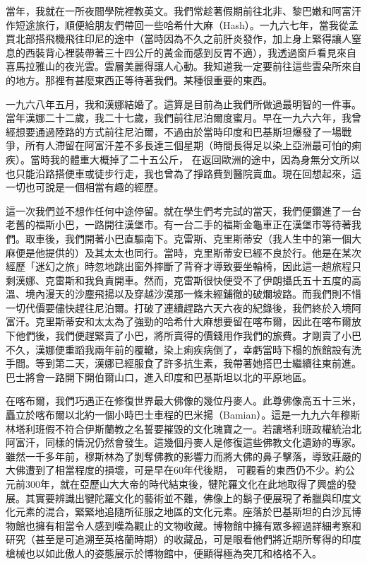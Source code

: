 當年，我就在一所夜間學院裡教英文。我們常趁著假期前往北非、黎巴嫩和阿富汗作短途旅行，順便給朋友們帶回一些哈希什大麻（Hash）。一九六七年，當我從孟買北部搭飛機飛往印尼的途中（當時因為不久之前肝炎發作，加上身上緊得讓人窒息的西裝背心裡裝帶著三十四公斤的黃金而感到反胃不適），我透過窗戶看見來自喜馬拉雅山的夜光雲。雲層美麗得讓人心動。我知道我一定要前往這些雲朵所來自的地方。那裡有甚麼東西正等待著我們。某種很重要的東西。

一九六八年五月，我和漢娜結婚了。這算是目前為止我們所做過最明智的一件事。當年漢娜二十二歲，我二十七歲，我們前往尼泊爾度蜜月。早在一九六六年，我曾經想要通過陸路的方式前往尼泊爾，不過由於當時印度和巴基斯坦爆發了一場戰爭，所有人滯留在阿富汗差不多長達三個星期（時間長得足以染上亞洲最可怕的痢疾）。當時我的體重大概掉了二十五公斤，
在返回歐洲的途中，因為身無分文所以也只能沿路搭便車或徒步行走，我也曾為了掙路費到醫院賣血。現在回想起來，這一切也可說是一個相當有趣的經歷。

這一次我們並不想作任何中途停留。就在學生們考完試的當天，我們便鑽進了一台老舊的福斯小巴，一路開往漢堡市。有一台二手的福斯金龜車正在漢堡市等待著我們。取車後，我們開著小巴直驅南下。克雷斯、克里斯蒂安（我人生中的第一個大麻便是他提供的）及其太太也同行。當時，克里斯蒂安已經不良於行。他是在某次經歷「迷幻之旅」時忽地跳出窗外摔斷了背脊才導致要坐輪椅，因此這一趟旅程只剩漢娜、克雷斯和我負責開車。然而，克雷斯很快便受不了伊朗攝氏五十五度的高溫、境內漫天的沙塵飛揚以及穿越沙漠那一條未經鋪徹的破爛坡路。而我們則不惜一切代價要儘快趕往尼泊爾。打破了連續趕路六天六夜的紀錄後，我們終於入境阿富汗。克里斯蒂安和太太為了強勁的哈希什大麻想要留在喀布爾，因此在喀布爾放下他們後，我們便趕緊賣了小巴，將所賣得的價錢用作我們的旅費。才剛賣了小巴不久，漢娜便重蹈我兩年前的覆轍，染上痢疾病倒了，幸虧當時下榻的旅館設有洗手間。等到第二天，漢娜已經服食了許多抗生素，我帶著她搭巴士繼續往東前進。巴士將會一路開下開伯爾山口，進入印度和巴基斯坦以北的平原地區。


在喀布爾，我們巧遇正在修復世界最大佛像的幾位丹麥人。此尊佛像高五十三米，矗立於喀布爾以北約一個小時巴士車程的巴米揚（Bamian）。這是一九九六年穆斯林塔利班假不符合伊斯蘭教之名誓要摧毀的文化瑰寶之一。若讓塔利班政權統治北阿富汗，同樣的情況仍然會發生。這幾個丹麥人是修復這些佛教文化遺跡的專家。雖然一千多年前，穆斯林為了剝奪佛教的影響力而將大佛的鼻子擊落，導致莊嚴的大佛遭到了相當程度的損壞，可是早在60年代後期，%
可觀看的東西仍不少。約公元前300年，就在亞歷山大大帝的時代結束後，犍陀羅文化在此地取得了興盛的發展。其實要辨識出犍陀羅文化的藝術並不難，佛像上的鬍子便展現了希臘與印度文化元素的混合，緊緊地追隨所征服之地區的文化元素。座落於巴基斯坦的白沙瓦博物館也擁有相當令人感到嘆為觀止的文物收藏。博物館中擁有眾多經過詳細考察和研究（甚至是可追溯至英格蘭時期）的收藏品，可是眼看他們將近期所奪得的印度槍械也以如此傲人的姿態展示於博物館中，便顯得極為突兀和格格不入。

